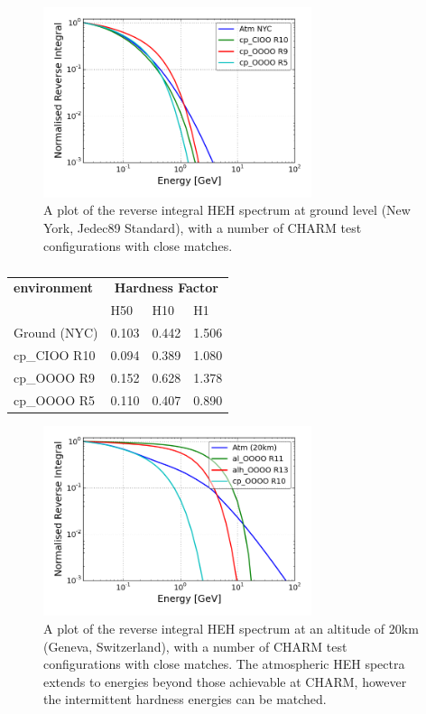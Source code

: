 \begin{figure}[ht!]
	\centering
	\includegraphics[width=0.7\textwidth]{./images/hardness/atm0km_charm_comparison}
	\caption{A plot of the reverse integral HEH spectrum at ground level (New York, Jedec89 Standard), with a number of CHARM test configurations with close matches.}
	\label{fig:atm0km_charm_comparison}
\end{figure}

\begin{table}[htbp]
\centering
\begin{tabular}{l|l|l|l}
\textbf{environment} & \multicolumn{3}{c}{\textbf{Hardness Factor}} \\ \cline{2-4}
				& H50   & H10   & H1 \\
\hline
\hline
\rowcolor{gray!30} Ground (NYC) & 0.103 & 0.442 & 1.506 \\
cp\_CIOO R10	& 0.094 & 0.389 & 1.080 \\
cp\_OOOO R9		& 0.152 & 0.628 & 1.378 \\
cp\_OOOO R5 	& 0.110 & 0.407 & 0.890 \\
\end{tabular}%
\caption{}
\label{tab:hardness_factor_atm_nyc}%
\end{table}%

\clearpage

\begin{figure}[ht!]
	\centering
	\includegraphics[width=0.7\textwidth]{./images/hardness/atm20km_charm_comparison}
	\caption{A plot of the reverse integral HEH spectrum at an altitude of 20km (Geneva, Switzerland), with a number of CHARM test configurations with close matches. The atmospheric HEH spectra extends to energies beyond those achievable at CHARM, however the intermittent hardness energies can be matched.}
	\label{fig:atm20km_charm_comparison}
\end{figure}

